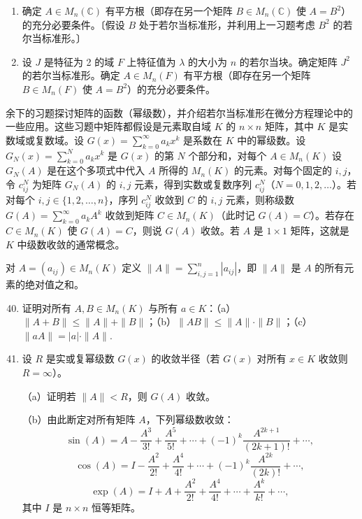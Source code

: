 \begin{enumerate}
（a）证明若 \(\lambda \neq 0\)，则矩阵 \(J^2\) 的若尔当标准形是特征值为 \(\lambda^2\) 的大小为 \(n\) 的若尔当块。

（b）若 \(\lambda = 0\)，证明 \(J^2\) 的若尔当标准形有两个块（特征值为 0），当 \(n\) 为偶数时大小均为 \(n/2\)；当 \(n\) 为奇数时大小分别为 \((n-1)/2\) 与 \((n+1)/2\).

\item 确定 \(A \in M_n(\mathbb{C})\) 有平方根（即存在另一个矩阵 \(B \in M_n(\mathbb{C})\) 使 \(A = B^2\)）的充分必要条件。〔假设 \(B\) 处于若尔当标准形，并利用上一习题考虑 \(B^2\) 的若尔当标准形。〕

\item 设 \(J\) 是特征为 2 的域 \(F\) 上特征值为 \(\lambda\) 的大小为 \(n\) 的若尔当块。确定矩阵 \(J^2\) 的若尔当标准形。确定 \(A \in M_n(F)\) 有平方根（即存在另一个矩阵 \(B \in M_n(F)\) 使 \(A = B^2\)）的充分必要条件。
\end{enumerate}

\noindent 余下的习题探讨矩阵的函数（幂级数），并介绍若尔当标准形在微分方程理论中的一些应用。这些习题中矩阵都假设是元素取自域 \(K\) 的 \(n \times n\) 矩阵，其中 \(K\) 是实数域或复数域。设 \(G(x) = \sum_{k=0}^{\infty}a_kx^k\) 是系数在 \(K\) 中的幂级数。设 \(G_N(x) = \sum_{k=0}^{N}a_kx^k\) 是 \(G(x)\) 的第 \(N\) 个部分和，对每个 \(A \in M_n(K)\) 设 \(G_N(A)\) 是在这个多项式中代入 \(A\) 所得的 \(M_n(K)\) 的元素。对每个固定的 \(i, j\)，令 \(c_{ij}^N\) 为矩阵 \(G_N(A)\) 的 \(i, j\) 元素，得到实数或复数序列 \(c_{ij}^N\)（\(N = 0, 1, 2, \ldots\)）。若对每个 \(i, j \in \{1, 2, \ldots, n\}\)，序列 \(c_{ij}^N\) 收敛到 \(C\) 的 \(i, j\) 元素，则称级数 \(G(A) = \sum_{k=0}^{\infty}a_kA^k\) 收敛到矩阵 \(C \in M_n(K)\)（此时记 \(G(A) = C\)）。若存在 \(C \in M_n(K)\) 使 \(G(A) = C\)，则说 \(G(A)\) 收敛。若 \(A\) 是 \(1 \times 1\) 矩阵，这就是 \(K\) 中级数收敛的通常概念。

\noindent 对 \(A = (a_{ij}) \in M_n(K)\) 定义 \(\|A\| = \sum_{i,j=1}^n |a_{ij}|\)，即 \(\|A\|\) 是 \(A\) 的所有元素的绝对值之和。

\begin{enumerate}
\setcounter{enumi}{39}
\item 证明对所有 \(A, B \in M_n(K)\) 与所有 \(a \in K\)：（a）\(\|A+B\| \leq \|A\|+\|B\|\)；（b）\(\|AB\| \leq \|A\| \cdot \|B\|\)；（c）\(\|aA\| = |a| \cdot \|A\|\).

\item 设 \(R\) 是实或复幂级数 \(G(x)\) 的收敛半径（若 \(G(x)\) 对所有 \(x \in K\) 收敛则 \(R = \infty\)）。

（a）证明若 \(\|A\| < R\)，则 \(G(A)\) 收敛。

（b）由此断定对所有矩阵 \(A\)，下列幂级数收敛：
\[
\sin(A) = A-\frac{A^3}{3!}+\frac{A^5}{5!}+\cdots+(-1)^k\frac{A^{2k+1}}{(2k+1)!}+\cdots,
\]
\[
\cos(A) = I-\frac{A^2}{2!}+\frac{A^4}{4!}+\cdots+(-1)^k\frac{A^{2k}}{(2k)!}+\cdots,
\]
\[
\exp(A) = I+A+\frac{A^2}{2!}+\frac{A^4}{4!}+\cdots+\frac{A^k}{k!}+\cdots,
\]
其中 \(I\) 是 \(n \times n\) 恒等矩阵。
\end{enumerate}

